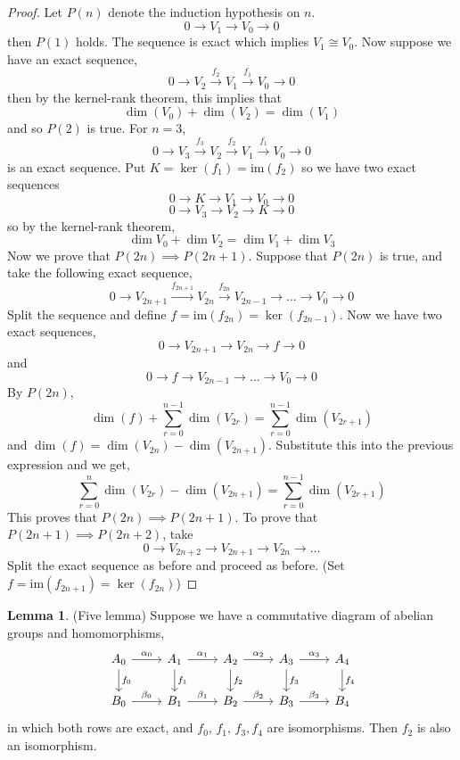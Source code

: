 \documentclass[a4paper,14pt]{extarticle}
\theoremstyle{definition}
\newtheorem*{lemma}{Lemma}
\begin{document}
\begin{proof}
	Let $P(n)$ denote the induction hypothesis on $n$.
	\[0\rightarrow V_1\rightarrow V_0\rightarrow 0\]
	then $P(1)$ holds. The sequence is exact which implies $V_1\cong V_0$.
	Now suppose we have an exact sequence,
	\[0\rightarrow V_2\xrightarrow{f_2}V_1\xrightarrow{f_1}V_0\rightarrow 0\]
	then by the kernel-rank theorem, this implies that
	\[\dim(V_0)+\dim(V_2)=\dim(V_1)\] and so $P(2)$ is true. For $n=3$,
	\[0\rightarrow V_3\xrightarrow{f_3} V_2\xrightarrow{f_2}V_1\xrightarrow{f_1}V_0\rightarrow 0\] is an exact sequence. Put $K=\ker(f_1)=\text{im}(f_2)$ so we have two exact 
	sequences
	\[0\rightarrow K\rightarrow V_1\rightarrow V_0\rightarrow 0\]
	\[0\rightarrow V_3\rightarrow V_2\rightarrow K\rightarrow 0\]
	so by the kernel-rank theorem,
	\[\dim V_0 + \dim V_2 = \dim V_1 + \dim V_3\]
	 Now we prove
	that $P(2n)\implies P(2n+1)$. Suppose that $P(2n)$ is true, and take
	the following exact sequence,
	\[0\rightarrow V_{2n+1}\xrightarrow{f_{2n+1}}V_{2n}\xrightarrow{f_{2n}}
	V_{2n-1}\rightarrow\ldots\rightarrow V_0\rightarrow 0\] Split the sequence and define $f=\text{im}(f_{2n})=\ker(f_{2n-1})$. Now we have two exact sequences,
	\[0\rightarrow V_{2n+1}\rightarrow V_{2n}\rightarrow f\rightarrow 0\]
	and \[0\rightarrow f\rightarrow V_{2n-1}\rightarrow\ldots\rightarrow V_0
	\rightarrow 0\] By $P(2n)$, \[\dim(f)+\sum_{r=0}^{n-1}\dim(V_{2r})=
	\sum_{r=0}^{n-1}\dim(V_{2r+1})\] and $\dim(f)=\dim(V_{2n})-\dim(V_{2n+1})$.
	Substitute this into the previous expression and we get,
	\[\sum_{r=0}^n\dim(V_{2r})-\dim(V_{2n+1})=\sum_{r=0}^{n-1}\dim(V_{2r+1})\]
	This proves that $P(2n)\implies P(2n+1)$. To prove that
	$P(2n+1)\implies P(2n+2)$, take
	\[0\rightarrow V_{2n+2}\rightarrow V_{2n+1}\rightarrow
	V_{2n}\rightarrow\ldots\] Split the exact sequence as before and
	proceed as before. (Set $f=\text{im}(f_{2n+1})=\ker(f_{2n})$)
\end{proof}

\begin{lemma}{(Five lemma)}
	Suppose we have a commutative diagram of abelian groups and homomorphisms,
	\[
	\begin{tikzcd}
		A_0\arrow{r}{\alpha_0} \arrow{d}{f_0} & A_1 \arrow{r}{\alpha_1}
		\arrow{d}{f_1} & A_2 \arrow{r}{\alpha_2} \arrow{d}{f_2} &
		A_3 \arrow{r}{\alpha_3} \arrow{d}{f_3} & A_4 \arrow{d}{f_4} \\
		B_0 \arrow{r}{\beta_0} & B_1 \arrow{r}{\beta_1} & B_2 \arrow{r}{\beta_2}
		& B_3 \arrow{r}{\beta_3} & B_4
	\end{tikzcd}
	\]
	in which both rows are exact, and $f_0, \,f_1, \,f_3, f_4$ are
	isomorphisms. Then $f_2$ is also an isomorphism.
\end{lemma}
\end{document}
